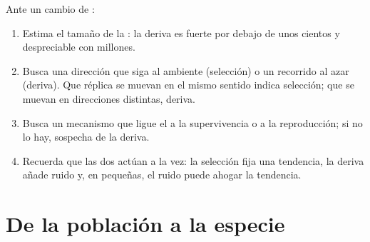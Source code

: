 \begin{method}\label{met:g12:selection-drift-speciation:which}
Ante un cambio de :
\begin{enumerate}
  \item Estima el tamaño de la : la deriva es fuerte por
        debajo de unos cientos y despreciable con millones.
  \item Busca una dirección que siga al ambiente (selección) o un
        recorrido al azar (deriva). Que  réplica se muevan
        en el mismo sentido indica selección; que se muevan en
        direcciones distintas, deriva.
  \item Busca un mecanismo que ligue el  a la supervivencia o a la
        reproducción; si no lo hay, sospecha de la deriva.
  \item Recuerda que las dos actúan a la vez: la selección fija una
        tendencia, la deriva añade ruido y, en  pequeñas, el
        ruido puede ahogar la tendencia.
\end{enumerate}
\end{method}

\section{De la población a la especie}

